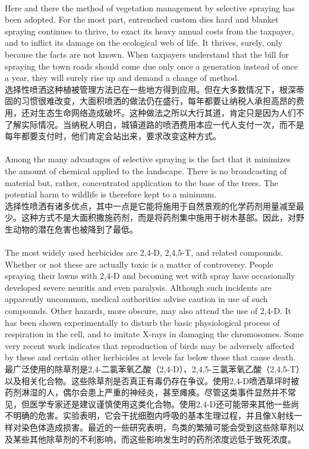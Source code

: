 \documentclass{article}
\begin{document}
\\
Here and there the method of vegetation management by selective spraying has been adopted. For the most part, entrenched custom dies hard and blanket spraying continues to thrive, to exact its heavy annual costs from the taxpayer, and to inflict its damage on the ecological web of life. It thrives, surely, only because the facts are not known. When taxpayers understand that the bill for spraying the town roads should come due only once a generation instead of once a year, they will surely rise up and demand a change of method.\\
选择性喷洒这种植被管理方法已在一些地方得到应用。但在大多数情况下，根深蒂固的习惯很难改变，大面积喷洒的做法仍在盛行，每年都要让纳税人承担高昂的费用，还对生态生命网络造成破坏。这种做法之所以大行其道，肯定只是因为人们不了解实际情况。当纳税人明白，城镇道路的喷洒费用本应一代人支付一次，而不是每年都要支付时，他们肯定会站出来，要求改变这种方式。 \\

\\
Among the many advantages of selective spraying is the fact that it minimizes the amount of chemical applied to the landscape. There is no broadcasting of material but, rather, concentrated application to the base of the trees. The potential harm to wildlife is therefore kept to a minimum.\\
选择性喷洒有诸多优点，其中一点是它能将施用于自然景观的化学药剂用量减至最少。这种方式不是大面积撒施药剂，而是将药剂集中施用于树木基部。因此，对野生动物的潜在危害也被降到了最低。 \\

\\
The most widely used herbicides are 2,4-D, 2,4,5-T, and related compounds. Whether or not these are actually toxic is a matter of controversy. People spraying their lawns with 2,4-D and becoming wet with spray have occasionally developed severe neuritis and even paralysis. Although such incidents are apparently uncommon, medical authorities advise caution in use of such compounds. Other hazards, more obscure, may also attend the use of 2,4-D. It has been shown experimentally to disturb the basic physiological process of respiration in the cell, and to imitate X-rays in damaging the chromosomes. Some very recent work indicates that reproduction of birds may be adversely affected by these and certain other herbicides at levels far below those that cause death. \\
最广泛使用的除草剂是2,4-二氯苯氧乙酸（2,4-D）、2,4,5-三氯苯氧乙酸（2,4,5-T）以及相关化合物。这些除草剂是否真正有毒仍存在争议。使用2,4-D喷洒草坪时被药剂淋湿的人，偶尔会患上严重的神经炎，甚至瘫痪。尽管这类事件显然并不常见，但医学专家还是建议谨慎使用这类化合物。使用2,4-D还可能带来其他一些尚不明确的危害。实验表明，它会干扰细胞内呼吸的基本生理过程，并且像X射线一样对染色体造成损害。最近的一些研究表明，鸟类的繁殖可能会受到这些除草剂以及某些其他除草剂的不利影响，而这些影响发生时的药剂浓度远低于致死浓度。 \\
\end{document}
